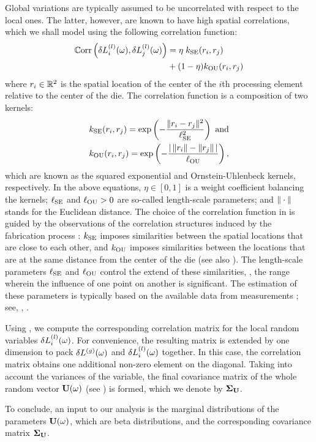 Global variations are typically assumed to be uncorrelated with respect to the local ones.
The latter, however, are known to have high spatial correlations, which we shall model using the following correlation function:
\begin{align}
  \oCorr{\lLeff_i(\o), \lLeff_j(\o)} &= \eta \; \fCorr_\SE(\r_i, \r_j) \nonumber \\
  & {} + (1 - \eta) \fCorr_\OU(\r_i, \r_j) \elabel{correlation-function}
\end{align}
where $r_i \in \mathbb{R}^2$ is the spatial location of the center of the $i$th processing element relative to the center of the die. The correlation function is a composition of two kernels:
\begin{align*}
  & \fCorr_\SE(\r_i, \r_j) = \exp\left(-\frac{\norm{\r_i - \r_j}^2}{\ell_\SE^2}\right) \text{ and} \\
  & \fCorr_\OU(\r_i, \r_j) = \exp\left(- \frac{\abs{\,\norm{\r_i} - \norm{\r_j}\,}}{\ell_\OU} \right),
\end{align*}
which are known as the squared exponential and Ornstein-Uhlenbeck kernels, respectively.
In the above equations, $\eta \in [0, 1]$ is a weight coefficient balancing the kernels; $\ell_{\text{SE}}$ and $\ell_{\text{OU}} > 0$ are so-called length-scale parameters; and $\| \cdot \|$ stands for the Euclidean distance.
The choice of the correlation function in  is guided by the observations of the correlation structures induced by the fabrication process \cite{chandrakasan2001, friedberg2005, cheng2011}: $\fCorr_\SE$ imposes similarities between the spatial locations that are close to each other, and $\fCorr_\OU$ imposes similarities between the locations that are at the same distance from the center of the die (see also \cite{ghanem1991, ghanta2006}).
The length-scale parameters $\ell_{\text{SE}}$ and $\ell_{\text{OU}}$ control the extend of these similarities, \ie, the range wherein the influence of one point on another is significant. The estimation of these parameters is typically based on the available data from measurements \cite{ghanta2006}; see, \eg, \cite{friedberg2005}.

Using , we compute the corresponding correlation matrix for the local random variables $\delta L^{(l)}_i(\omega)$.
For convenience, the resulting matrix is extended by one dimension to pack ${\delta L^{(g)}}(\omega)$ and $\delta L^{(l)}_i(\omega)$ together.
In this case, the correlation matrix obtains one additional non-zero element on the diagonal.
Taking into account the variances of the variable, the final covariance matrix of the whole random vector $\mathbf{U}(\omega)$ (see ) is formed, which we denote by $\mCov_\vU$.

To conclude, an input to our analysis is the marginal distributions of the parameters $\mathbf{U}(\omega)$, which are beta distributions, and the corresponding covariance matrix $\mCov_\vU$.
